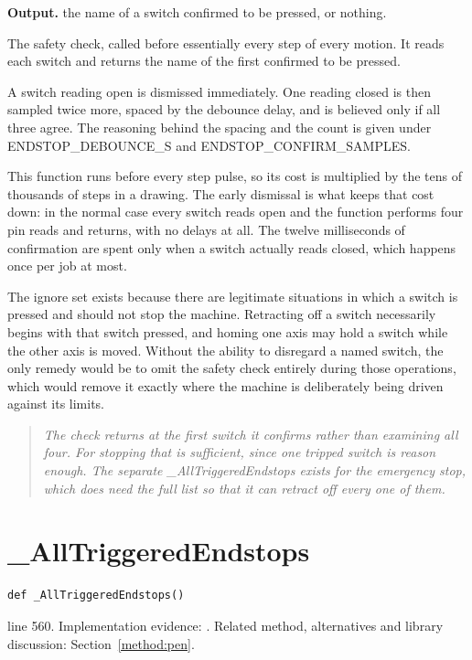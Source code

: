 \noindent\textbf{Output.} the name of a switch confirmed to be pressed, or nothing.


The safety check, called before essentially every step of every motion. It reads each switch and returns the name of the first confirmed to be pressed.


A switch reading open is dismissed immediately. One reading closed is then sampled twice more, spaced by the debounce delay, and is believed only if all three agree. The reasoning behind the spacing and the count is given under ENDSTOP\_DEBOUNCE\_S and ENDSTOP\_CONFIRM\_SAMPLES.


This function runs before every step pulse, so its cost is multiplied by the tens of thousands of steps in a drawing. The early dismissal is what keeps that cost down: in the normal case every switch reads open and the function performs four pin reads and returns, with no delays at all. The twelve milliseconds of confirmation are spent only when a switch actually reads closed, which happens once per job at most.


The ignore set exists because there are legitimate situations in which a switch is pressed and should not stop the machine. Retracting off a switch necessarily begins with that switch pressed, and homing one axis may hold a switch while the other axis is moved. Without the ability to disregard a named switch, the only remedy would be to omit the safety check entirely during those operations, which would remove it exactly where the machine is deliberately being driven against its limits.


\begin{quote}\small\itshape The check returns at the first switch it confirms rather than examining all four. For stopping that is sufficient, since one tripped switch is reason enough. The separate \_AllTriggeredEndstops exists for the emergency stop, which does need the full list so that it can retract off every one of them.\end{quote}


\section{\_AllTriggeredEndstops}\label{fn:reproduce:-AllTriggeredEndstops}
\begin{lstlisting}[style=sig]
def _AllTriggeredEndstops()
\end{lstlisting}
 line 560. Implementation evidence: \cite{code2026}. Related method, alternatives and library discussion: Section~\ref{method:pen}.


